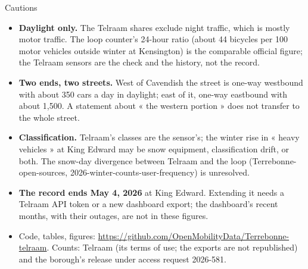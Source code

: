 \documentclass[aspectratio=169,10pt]{beamer}\usetheme{default}\usecolortheme{seahorse}\setbeamertemplate{navigation symbols}{}\setbeamertemplate{footline}[frame number]
\begin{document}
\begin{frame}{Cautions}\begin{itemize}
\item \textbf{Daylight only.} The Telraam shares exclude night traffic, which is mostly motor traffic. The loop counter\textquoteright{}s 24-hour ratio (about 44 bicycles per 100 motor vehicles outside winter at Kensington) is the comparable official figure; the Telraam sensors are the check and the history, not the record.
\item \textbf{Two ends, two streets.} West of Cavendish the street is one-way westbound with about 350 cars a day in daylight; east of it, one-way eastbound with about 1,500. A statement about « the western portion » does not transfer to the whole street.
\item \textbf{Classification.} Telraam\textquoteright{}s classes are the sensor\textquoteright{}s; the winter rise in « heavy vehicles » at King Edward may be snow equipment, classification drift, or both. The snow-day divergence between Telraam and the loop (Terrebonne-open-sources, 2026-winter-counts-user-frequency) is unresolved.
\item \textbf{The record ends May 4, 2026} at King Edward. Extending it needs a Telraam API token or a new dashboard export; the dashboard\textquoteright{}s recent months, with their outages, are not in these figures.
\item Code, tables, figures: \url{https://github.com/OpenMobilityData/Terrebonne-telraam}. Counts: Telraam (its terms of use; the exports are not republished) and the borough\textquoteright{}s release under access request 2026-581.
\end{itemize}\end{frame}
\appendix
\end{document}

